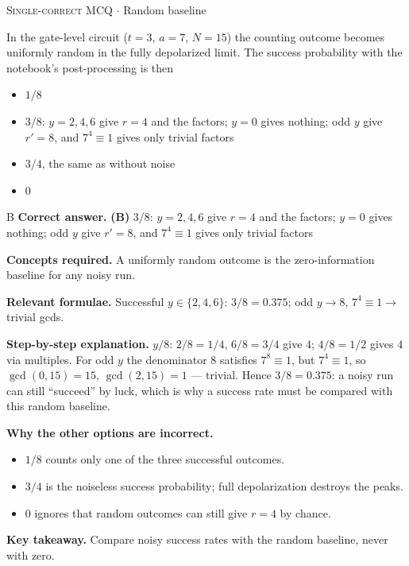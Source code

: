 \documentclass[11pt,a4paper]{article}
\newcommand{\optlabel}[1]{\textbf{(#1)}}
\newcommand{\correctlabel}[1]{\textcolor{okgreen}{\textbf{(#1)}\,\ding{51}}}
\newenvironment{qitem}[1]{\begin{list}{}{\setlength{\leftmargin}{3.3em}\setlength{\labelwidth}{3.1em}%
  \setlength{\labelsep}{0.2em}\setlength{\topsep}{3pt}\setlength{\parsep}{3pt}}\item[\textbf{Q.#1}\hfill]}{\end{list}}
\newcommand{\qsep}{\par\vspace{2pt}{\color{black!15}\hrule}\vspace{4pt}}
\newcommand{\qmeta}[2]{{\footnotesize\color{black!60}\textsc{#1} \;$\cdot$\; #2}\par}
\begin{document}
\begin{qitem}{70}
\qmeta{Single-correct MCQ}{Random baseline}
In the gate-level circuit ($t = 3$, $a = 7$, $N = 15$) the counting outcome becomes uniformly random in the fully depolarized limit. The success
probability with the notebook's post-processing is then
\begin{itemize}[leftmargin=2.6em, labelsep=0.4em, itemsep=2pt, topsep=3pt]
\item[\optlabel{A}] $1/8$
\item[\correctlabel{B}] $3/8$: $y = 2, 4, 6$ give $r = 4$ and the factors; $y = 0$ gives nothing; odd $y$ give $r' = 8$, and $7^4 \equiv 1$ gives only trivial factors
\item[\optlabel{C}] $3/4$, the same as without noise
\item[\optlabel{D}] $0$
\end{itemize}
\end{qitem}
\begin{solbox}{B}
\textbf{\color{brand}Correct answer.} \textcolor{okgreen}{\textbf{(B)}} $3/8$: $y = 2, 4, 6$ give $r = 4$ and the factors; $y = 0$ gives nothing; odd $y$ give $r' = 8$, and $7^4 \equiv 1$ gives only trivial factors

\textbf{\color{brand}Concepts required.} A uniformly random outcome is the zero-information baseline for any noisy run.

\textbf{\color{brand}Relevant formulae.} Successful $y \in \{2, 4, 6\}$: $3/8 = 0.375$; odd $y \to 8$, $7^4 \equiv 1 \to$ trivial gcds.

\textbf{\color{brand}Step-by-step explanation.} $y/8$: $2/8 = 1/4$, $6/8 = 3/4$ give $4$; $4/8 = 1/2$ gives $4$ via multiples. For odd $y$ the denominator $8$ satisfies $7^8 \equiv 1$, but $7^{4} \equiv 1$, so
$\gcd(0, 15) = 15$, $\gcd(2, 15) = 1$ --- trivial. Hence $3/8 = 0.375$: a noisy run can still ``succeed'' by luck, which is why a success rate must be compared
with this random baseline.

\textbf{\color{brand}Why the other options are incorrect.}
\begin{itemize}[leftmargin=2.4em, itemsep=1pt, topsep=2pt]
\item[\textbf{(A)}] $1/8$ counts only one of the three successful outcomes.
\item[\textbf{(C)}] $3/4$ is the noiseless success probability; full depolarization destroys the peaks.
\item[\textbf{(D)}] $0$ ignores that random outcomes can still give $r = 4$ by chance.
\end{itemize}
\textbf{\color{brand}Key takeaway.} Compare noisy success rates with the random baseline, never with zero.
\end{solbox}
\qsep
\end{document}
